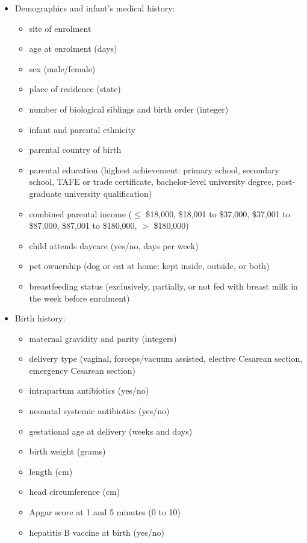 \documentclass{bmcart}
\begin{document}
\begin{itemize}
    \item Demographics and infant’s medical history:
    \begin{itemize}
        \item site of enrolment
        \item age at enrolment (days)
        \item sex (male/female)
        \item place of residence (state)
        \item number of biological siblings and birth order (integer)
        \item infant and parental ethnicity
        \item parental country of birth
        \item parental education (highest achievement: primary school, secondary school, TAFE or trade certificate, bachelor-level university degree, post-graduate university qualification)
	    \item combined parental income ($\leq$ \$18,000, \$18,001 to \$37,000, \$37,001 to \$87,000, \$87,001 to \$180,000, $>$ \$180,000)
	    \item child attends daycare (yes/no, days per week)
	    \item pet ownership (dog or cat at home; kept inside, outside, or both)
	    \item breastfeeding status (exclusively, partially, or not fed with breast milk in the week before enrolment)
    \end{itemize}
    \item Birth history:
    \begin{itemize}
        \item maternal gravidity and parity (integers)
        \item delivery type (vaginal, forceps/vacuum assisted, elective Cesarean section, emergency Cesarean section)
        \item intrapartum antibiotics (yes/no)
        \item neonatal systemic antibiotics (yes/no)
        \item gestational age at delivery (weeks and days)
        \item birth weight (grams)
        \item length (cm)
        \item head circumference (cm)
        \item Apgar score at 1 and 5 minutes (0 to 10)
        \item hepatitis B vaccine at birth (yes/no)

\end{itemize}
\end{itemize}
\end{document}
